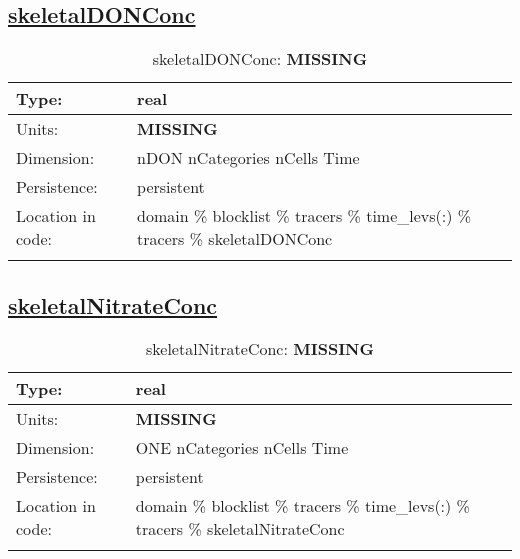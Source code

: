 \subsection[skeletalDONConc]{\hyperref[sec:var_tab_tracers]{skeletalDONConc}}
\label{subsec:var_sec_tracers_skeletalDONConc}
\begin{center}
\begin{longtable}{| p{2.0in} | p{4.0in} |}
        \hline 
        Type: & real \\
        \hline 
        Units: & {\bf \color{red} MISSING} \\
        \hline 
        Dimension: & nDON nCategories nCells Time \\
        \hline 
        Persistence: & persistent \\
        \hline 
         Location in code: & domain \% blocklist \% tracers \% time\_levs(:) \% tracers \% skeletalDONConc \\
         \hline 
    \caption{skeletalDONConc: {\bf \color{red} MISSING}}
\end{longtable}
\end{center}
\subsection[skeletalNitrateConc]{\hyperref[sec:var_tab_tracers]{skeletalNitrateConc}}
\label{subsec:var_sec_tracers_skeletalNitrateConc}
\begin{center}
\begin{longtable}{| p{2.0in} | p{4.0in} |}
        \hline 
        Type: & real \\
        \hline 
        Units: & {\bf \color{red} MISSING} \\
        \hline 
        Dimension: & ONE nCategories nCells Time \\
        \hline 
        Persistence: & persistent \\
        \hline 
         Location in code: & domain \% blocklist \% tracers \% time\_levs(:) \% tracers \% skeletalNitrateConc \\
         \hline 
    \caption{skeletalNitrateConc: {\bf \color{red} MISSING}}
\end{longtable}
\end{center}
